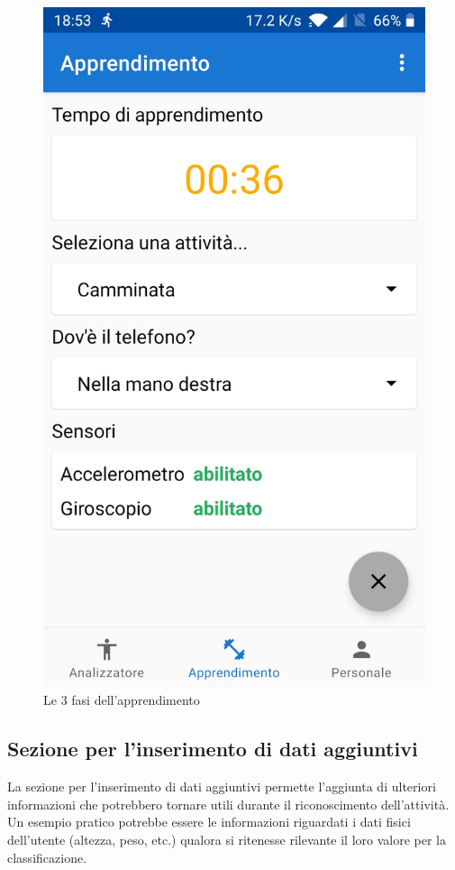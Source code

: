 \begin{figure}[H]
    \includegraphics[scale = 0.1019]{assets/images/screenshots/2c_Learning.jpg}
    \caption{Le 3 fasi dell'apprendimento}
    \label{fig:screenshots_learning}
\end{figure}


\subsection{Sezione per l'inserimento di dati aggiuntivi}
La sezione per l'inserimento di dati aggiuntivi permette l'aggiunta di ulteriori informazioni 
che potrebbero tornare utili durante il riconoscimento dell'attività.
Un esempio pratico potrebbe essere le informazioni riguardati i dati fisici dell'utente (altezza, peso, etc.) qualora 
si ritenesse rilevante il loro valore per la classificazione.

